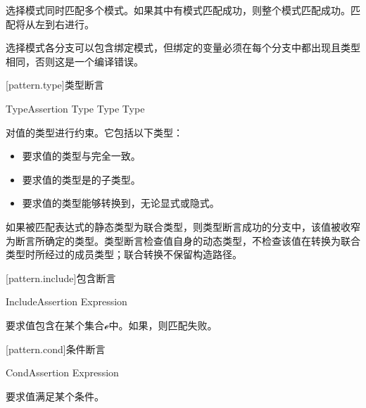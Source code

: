\pnum
选择模式同时匹配多个模式。如果其中有模式匹配成功，则整个模式匹配成功。匹配将从左到右进行。

\pnum
选择模式各分支可以包含绑定模式，但绑定的变量必须在每个分支中都出现且类型相同，否则这是一个编译错误。

[pattern.type]{类型断言}

\begin{bnf}{TypeAssertion}
     Type \br
    \terminal{:} Type \br
     Type
\end{bnf}

\pnum
{}对值的类型进行约束。它包括以下类型：

\begin{itemize}
    \item {}要求值的类型与完全一致。
    \item {}要求值的类型是的子类型。
    \item {}要求值的类型能够转换到，无论显式或隐式。
    \end{itemize}

\pnum
如果被匹配表达式的静态类型为联合类型，则类型断言成功的分支中，该值被收窄为断言所确定的类型。类型断言检查值自身的动态类型，不检查该值在转换为联合类型时所经过的成员类型；联合转换不保留构造路径。

[pattern.include]{包含断言}

\begin{bnf}{IncludeAssertion}
     Expression
\end{bnf}

\pnum
{}要求值包含在某个集合$\mathcal{e}$中。如果，则匹配失败。

[pattern.cond]{条件断言}

\begin{bnf}{CondAssertion}
     Expression
\end{bnf}

\pnum
{}要求值满足某个条件。

